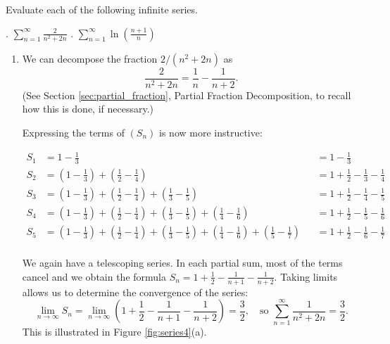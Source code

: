 \documentclass{ximera}
\begin{document}
\begin{example}
Evaluate each of the following infinite series.

. $\sum_{n=1}^\infty \frac{2}{n^2+2n}$ . $\sum_{n=1}^\infty \ln\left(\frac{n+1}{n}\right)$

\begin{enumerate}
\item We can decompose the fraction $2/(n^2+2n)$ as $$\frac2{n^2+2n}
  = \frac1n-\frac1{n+2}.$$ (See Section \ref{sec:partial_fraction},
  Partial Fraction Decomposition, to recall how this is done, if
  necessary.)
  
  Expressing the terms of $(S_n)$ is now more instructive:
  
  \begin{align*}
    S_1 &= 1-\frac13 &&= 1-\frac13\\
    S_2 &= \left(1-\frac13\right) + \left(\frac12-\frac14\right) &&= 1+\frac12-\frac13-\frac14\\
    S_3 &= \left(1-\frac13\right) + \left(\frac12-\frac14\right)+\left(\frac13-\frac15\right) &&= 1+\frac12-\frac14-\frac15\\
    S_4 &= \left(1-\frac13\right) + \left(\frac12-\frac14\right)+\left(\frac13-\frac15\right)+\left(\frac14-\frac16\right) &&= 1+\frac12-\frac15-\frac16\\
    S_5 &= \left(1-\frac13\right) + \left(\frac12-\frac14\right)+\left(\frac13-\frac15\right)+\left(\frac14-\frac16\right)+\left(\frac15-\frac17\right) &&= 1+\frac12-\frac16-\frac17\\
  \end{align*}
 
We again have a telescoping series. In each partial sum, most of the
terms cancel and we obtain the formula $S_n =
1+\frac12-\frac1{n+1}-\frac1{n+2}.$ Taking limits allows us to
determine the convergence of the series:
\[
\lim_{n\to\infty}S_n = \lim_{n\to\infty} \left(1+\frac12-\frac1{n+1}-\frac1{n+2}\right) = \frac32,\quad \text{so } \sum_{n=1}^\infty \frac1{n^2+2n} = \frac32.
\]
This is illustrated in Figure \ref{fig:series4}(a).


\end{enumerate}
\end{example}
\end{document}
